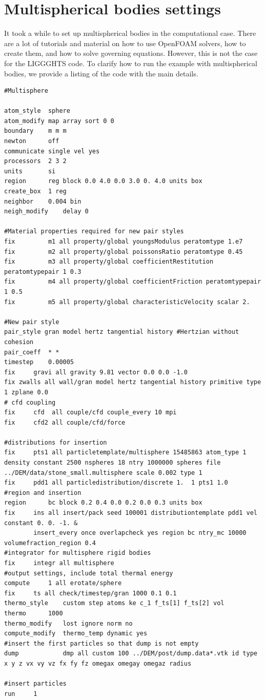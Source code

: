 \section{Multispherical bodies settings}

It took a while to set up multispherical bodies in the computational case. There are a lot of tutorials and material on how to use OpenFOAM solvers, how to create them, and how to solve governing equations. However, this is not the case for the LIGGGHTS code. To clarify how to run the example with multispherical bodies, we provide a listing of the code with the main details.

\begin{lstlisting}[caption={LIGGGHTS Script}, label={lst:liggghts-script}]
#Multisphere

atom_style	sphere
atom_modify	map array sort 0 0
boundary	m m m
newton		off
communicate	single vel yes
processors	2 3 2
units		si
region		reg block 0.0 4.0 0.0 3.0 0. 4.0 units box
create_box	1 reg
neighbor	0.004 bin
neigh_modify	delay 0

#Material properties required for new pair styles
fix 		m1 all property/global youngsModulus peratomtype 1.e7
fix 		m2 all property/global poissonsRatio peratomtype 0.45
fix 		m3 all property/global coefficientRestitution peratomtypepair 1 0.3
fix 		m4 all property/global coefficientFriction peratomtypepair 1 0.5
fix 		m5 all property/global characteristicVelocity scalar 2.

#New pair style
pair_style gran model hertz tangential history #Hertzian without cohesion
pair_coeff	* *
timestep	0.00005
fix		gravi all gravity 9.81 vector 0.0 0.0 -1.0
fix zwalls all wall/gran model hertz tangential history primitive type 1 zplane 0.0
# cfd coupling
fix     cfd  all couple/cfd couple_every 10 mpi
fix     cfd2 all couple/cfd/force

#distributions for insertion
fix		pts1 all particletemplate/multisphere 15485863 atom_type 1 density constant 2500 nspheres 18 ntry 1000000 spheres file ../DEM/data/stone_small.multisphere scale 0.002 type 1
fix		pdd1 all particledistribution/discrete 1.  1 pts1 1.0
#region and insertion
region		bc block 0.2 0.4 0.0 0.2 0.0 0.3 units box
fix		ins all insert/pack seed 100001 distributiontemplate pdd1 vel constant 0. 0. -1. &
		insert_every once overlapcheck yes region bc ntry_mc 10000 volumefraction_region 0.4
#integrator for multisphere rigid bodies
fix		integr all multisphere
#output settings, include total thermal energy
compute		1 all erotate/sphere
fix		ts all check/timestep/gran 1000 0.1 0.1
thermo_style	custom step atoms ke c_1 f_ts[1] f_ts[2] vol
thermo		1000
thermo_modify	lost ignore norm no
compute_modify	thermo_temp dynamic yes
#insert the first particles so that dump is not empty
dump            dmp all custom 100 ../DEM/post/dump.data*.vtk id type x y z vx vy vz fx fy fz omegax omegay omegaz radius

#insert particles
run		1
\end{lstlisting}
